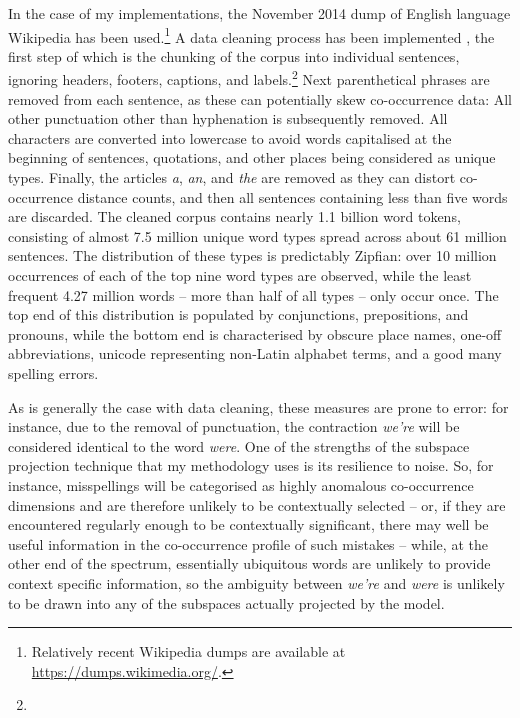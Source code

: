 In the case of my implementations, the November 2014 dump of English language Wikipedia has been used.\footnote{Relatively recent Wikipedia dumps are available at \url{https://dumps.wikimedia.org/}.}  A data cleaning process has been implemented , the first step of which is the chunking of the corpus into individual sentences, ignoring headers, footers, captions, and labels.\footnote{}  Next parenthetical phrases are removed from each sentence, as these can potentially skew co-occurrence data:   All other punctuation other than hyphenation is subsequently removed.  All characters are converted into lowercase to avoid words capitalised at the beginning of sentences, quotations, and other places being considered as unique types.  Finally, the articles \emph{a}, \emph{an}, and \emph{the} are removed as they can distort co-occurrence distance counts, and then all sentences containing less than five words are discarded.  The cleaned corpus contains nearly 1.1 billion word tokens, consisting of almost 7.5 million unique word types spread across about 61 million sentences.  The distribution of these types is predictably Zipfian: over 10 million occurrences of each of the top nine word types are observed, while the least frequent 4.27 million words -- more than half of all types -- only occur once.  The top end of this distribution is populated by conjunctions, prepositions, and pronouns, while the bottom end is characterised by obscure place names, one-off abbreviations, unicode representing non-Latin alphabet terms, and a good many spelling errors.

As is generally the case with data cleaning, these measures are prone to error: for instance, due to the removal of punctuation, the contraction \emph{we're} will be considered identical to the word \emph{were}.  One of the strengths of the subspace projection technique that my methodology uses is its resilience to noise.  So, for instance, misspellings will be categorised as highly anomalous co-occurrence dimensions and are therefore unlikely to be contextually selected -- or, if they are encountered regularly enough to be contextually significant, there may well be useful information in the co-occurrence profile of such mistakes -- while, at the other end of the spectrum, essentially ubiquitous words are unlikely to provide context specific information, so the ambiguity between \emph{we're} and \emph{were} is unlikely to be drawn into any of the subspaces actually projected by the model.


